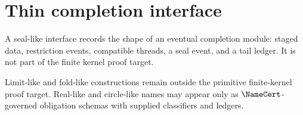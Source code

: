 \section{Thin completion interface}

\begin{definition}
A seal-like interface records the shape of an eventual completion module: staged data, restriction events, compatible threads, a seal event, and a tail ledger.  It is not part of the finite kernel proof target.
\end{definition}

\begin{remark}
Limit-like and fold-like constructions remain outside the primitive finite-kernel proof target. Real-like and circle-like names may appear only as $\NameCert$-governed obligation schemas with supplied classifiers and ledgers.
\end{remark}
